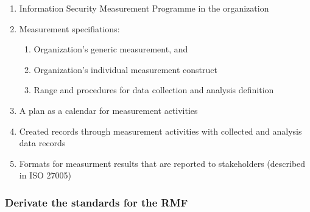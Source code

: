\begin{enumerate}
  \item Information Security Measurement Programme in the organization
  \item Measurement specifiations:
    \begin{enumerate}
      \item Organization's generic measurement, and
      \item Organization's individual measurement construct
      \item Range and procedures for data collection and analysis definition
    \end{enumerate}
    \item A plan as a calendar for measurement activities
    \item Created records through measurement activities with collected and analysis data records
    \item Formats for measurment results that are reported to stakeholders (described in ISO 27005)
\end{enumerate}

\cite{ISO_27004_2009}

\subsubsection*{Derivate the standards for the RMF}

